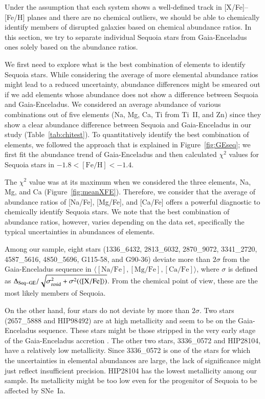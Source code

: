 \documentclass{aa}
\begin{document}
Under the assumption that each system shows a well-defined track in [{X}/{Fe}]--[{Fe}/{H}] planes and there are no chemical outliers, we should be able to chemically identify members of disrupted galaxies based on chemical abundance ratios.
In this section, we try to separate individual Sequoia stars from Gaia-Enceladus ones solely based on the abundance ratios. 

We first need to explore what is the best combination of elements to identify Sequoia stars.
While considering the average of more elemental abundance ratios might lead to a reduced uncertainty, abundance differences might be smeared out if we add elements whose abundance does not show a difference between Sequoia and Gaia-Enceladus.
We considered an average abundance of various combinations out of five elements (Na, Mg, Ca, Ti from Ti~II, and Zn) since they show a clear abundance difference between Sequoia and Gaia-Enceladus in our study (Table~\ref{tab:chitest}).
To quantitatively identify the best combination of elements, we followed the approach that is explained in Figure~\ref{fig:GEseq}; we first fit the abundance trend of Gaia-Enceladus and then calculated $\chi^2$ values for Sequoia stars in $-1.8<[\mathrm{Fe/H}]<-1.4$.

The $\chi^2$ value was at its maximum when we considered the three elements, Na, Mg, and Ca (Figure~\ref{fig:meanXFE}).
Therefore, we consider that the average of abundance ratios of [{Na}/{Fe}], [{Mg}/{Fe}], and [{Ca}/{Fe}] offers a powerful diagnostic to chemically identify Sequoia stars.
We note that the best combination of abundance ratios, however, varies depending on the data set, specifically the typical uncertainties in abundances of elements. 

Among our sample, eight stars (1336\_6432, 2813\_6032, 2870\_9072, 3341\_2720, 4587\_5616, 4850\_5696, G115-58, and G90-36) deviate more than $2\sigma$ from the Gaia-Enceladus sequence in $\langle [\mathrm{Na/Fe}],[\mathrm{Mg/Fe}],[\mathrm{Ca/Fe}]\rangle$, where $\sigma$ is defined as $\Delta_{\rm Seq-GE}/\sqrt{\sigma_{\rm resid}^2+\sigma^2(\langle[\mathrm{X/Fe}]\rangle)}$. 
From the chemical point of view, these are the most likely members of Sequoia. 

On the other hand, four stars do not deviate by more than $2\sigma$.
Two stars (2657\_5888 and HIP98492) are at high metallicity and seem to be on the Gaia-Enceladus sequence. 
These stars might be those stripped in the very early stage of the Gaia-Enceladus accretion \citep{Koppelman2019a}.
The other two stars, 3336\_0572 and HIP28104, have a relatively low metallicity. 
Since 3336\_0572 is one of the stars for which the uncertainties in elemental abundances are large, the lack of significance might just reflect insufficient precision.
HIP28104 has the lowest metallicity among our sample. 
Its metallicity might be too low even for the progenitor of Sequoia to be affected by SNe~Ia. 
\end{document}
